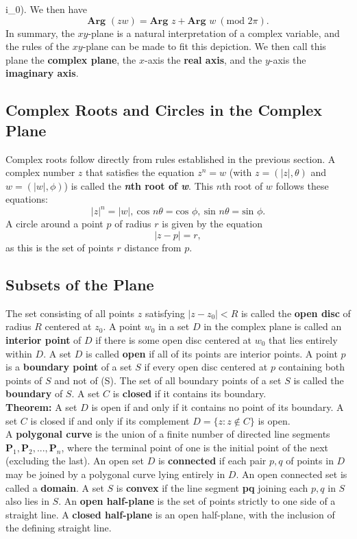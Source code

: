 \documentclass[12pt,letterpaper]{article}
\begin{document}
i\theta_{0}).\] We then have \[\textbf{Arg } (zw) = \textbf{Arg } z + \textbf{Arg } w\ (\text{mod } 2\pi).\] In summary, the \(xy\)-plane is a natural interpretation of a complex variable, and the rules of the \(xy\)-plane can be made to fit this depiction. We then call this plane the \textbf{complex plane}, the \(x\)-axis the \textbf{real axis}, and the \(y\)-axis the \textbf{imaginary axis}.

\subsection{Complex Roots and Circles in the Complex Plane}


Complex roots follow directly from rules established in the previous section. A complex number \(z\) that satisfies the equation \(z^{n} = w\) (with \(z = (|z|, \theta)\) and \(w = (|w|, \phi)\)) is called the \textbf{\textit{n}th root of \textit{w}}. This \(n\)th root of \(w\) follows these equations: \[|z|^{n} = |w|,\ \text{cos } n\theta = \text{cos } \phi,\ \text{sin } n\theta = \text{sin } \phi.\] A circle around a point \(p\) of radius \(r\) is given by the equation \[|z - p| = r,\] as this is the set of points \(r\) distance from \(p\).

\subsection{Subsets of the Plane}

The set consisting of all points \(z\) satisfying \(|z - z_{0}| < R\) is called the \textbf{open disc} of radius \(R\) centered at \(z_{0}\). A point \(w_{0}\) in a set \(D\) in the complex plane is called an \textbf{interior point} of \(D\) if there is some open disc centered at \(w_{0}\) that lies entirely within \(D\). A set \(D\) is called \textbf{open} if all of its points are interior points. A point \(p\) is a \textbf{boundary point} of a set \(S\) if every open disc centered at \(p\) containing both points of \(S\) and not of (S). The set of all boundary points of a set \(S\) is called the \textbf{boundary} of \(S\). A set \(C\) is \textbf{closed} if it contains its boundary. \\

\textbf{Theorem: } A set \(D\) is open if and only if it contains no point of its boundary. A set \(C\) is closed if and only if its complement \(D = \{z: z \notin C\}\) is open. \\

A \textbf{polygonal curve} is the union of a finite number of directed line segments \(\textbf{P}_{1}, \textbf{P}_{2}, ..., \textbf{P}_{n}\), where the terminal point of one is the initial point of the next (excluding the last). An open set \(D\) is \textbf{connected} if each pair \(p, q\) of points in \(D\) may be joined by a polygonal curve lying entirely in \(D\). An open connected set is called a \textbf{domain}. A set \(S\) is \textbf{convex} if the line segment \textbf{pq} joining each \(p,q\) in \(S\) also lies in \(S\). An \textbf{open half-plane} is the set of points strictly to one side of a straight line. A \textbf{closed half-plane} is an open half-plane, with the inclusion of the defining straight line.
\end{document}

